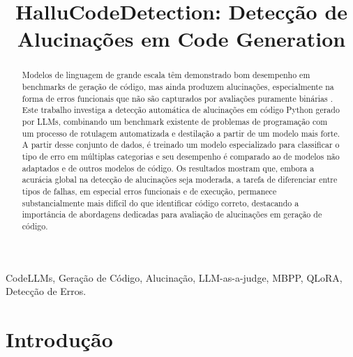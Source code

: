 \documentclass[conference]{IEEEtran}
\begin{document}
\title{HalluCodeDetection: Detecção de Alucinações em Code Generation}

\author{
\and
{}
}

 \maketitle

\begin{abstract}
Modelos de linguagem de grande escala têm demonstrado bom desempenho em benchmarks de geração de código, mas ainda produzem alucinações, especialmente na forma de erros funcionais que não são capturados por avaliações puramente binárias \cite{2407.06153,2504.20799}. Este trabalho investiga a detecção automática de alucinações em código Python gerado por LLMs, combinando um benchmark existente de problemas de programação com um processo de rotulagem automatizada e destilação a partir de um modelo mais forte. A partir desse conjunto de dados, é treinado um modelo especializado para classificar o tipo de erro em múltiplas categorias e seu desempenho é comparado ao de modelos não adaptados e de outros modelos de código. Os resultados mostram que, embora a acurácia global na detecção de alucinações seja moderada, a tarefa de diferenciar entre tipos de falhas, em especial erros funcionais e de execução, permanece substancialmente mais difícil do que identificar código correto, destacando a importância de abordagens dedicadas para avaliação de alucinações em geração de código.
\end{abstract}

\begin{IEEEkeywords}
CodeLLMs, Geração de Código, Alucinação, LLM-as-a-judge, MBPP, QLoRA, Detecção de Erros.
\end{IEEEkeywords}

\section{Introdução}
\end{document}

